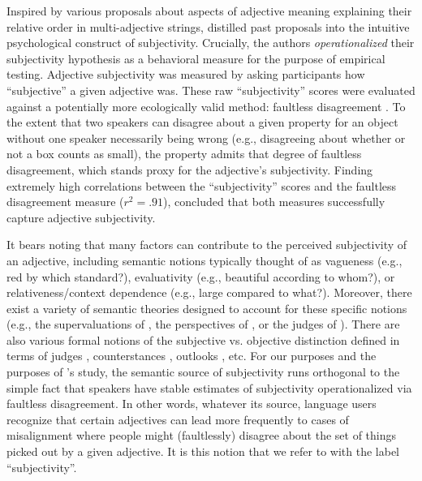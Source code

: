 \documentclass{sp}
\begin{document}
Inspired by various proposals about aspects of adjective meaning explaining their relative order in multi-adjective strings, \citeauthor{scontrasetal2017adjectives} distilled past proposals into the intuitive psychological construct of subjectivity. Crucially, the authors \emph{operationalized} their subjectivity hypothesis as a behavioral measure for the purpose of empirical testing. Adjective subjectivity was measured by asking participants how ``subjective'' a given adjective was. These raw ``subjectivity'' scores were evaluated against a potentially more ecologically valid method: faultless disagreement \citep[e.g.,][]{kolbel2004,macfarlane2014}. To the extent that two speakers can disagree about a given property for an object without one speaker necessarily being wrong (e.g., disagreeing about whether or not a box counts as small), the property admits that degree of faultless disagreement, which stands proxy for the adjective's subjectivity. Finding extremely high correlations between the ``subjectivity'' scores and the faultless disagreement measure ($r^2 = .91$), \citeauthor{scontrasetal2017adjectives} concluded that both measures successfully capture adjective subjectivity.

It bears noting that many factors can contribute to the perceived subjectivity of an adjective, including semantic notions typically thought of as vagueness (e.g., red by which standard?), evaluativity (e.g., beautiful according to whom?), or relativeness/context dependence (e.g., large compared to what?). Moreover, there exist a variety of semantic theories designed to account for these specific notions (e.g., the supervaluations of \citealt{kamppartee1995}, the perspectives of \citealt{kolbel2002}, or the judges of \citealt{lasersohn2005}). There are also various formal notions of the subjective vs. objective distinction defined in terms of judges \citep{saebo2009}, counterstances \citep{kennedywiller2016}, outlooks \citep{coppock2018}, etc. For our purposes and the purposes of \citeauthor{scontrasetal2017adjectives}'s study, the semantic source of subjectivity runs orthogonal to the simple fact that speakers have stable estimates of subjectivity operationalized via faultless disagreement. In other words, whatever its source, language users recognize that certain adjectives can lead more frequently to cases of misalignment where people might (faultlessly) disagree about the set of things picked out by a given adjective. It is this notion that we refer to with the label ``subjectivity''.
\end{document}
